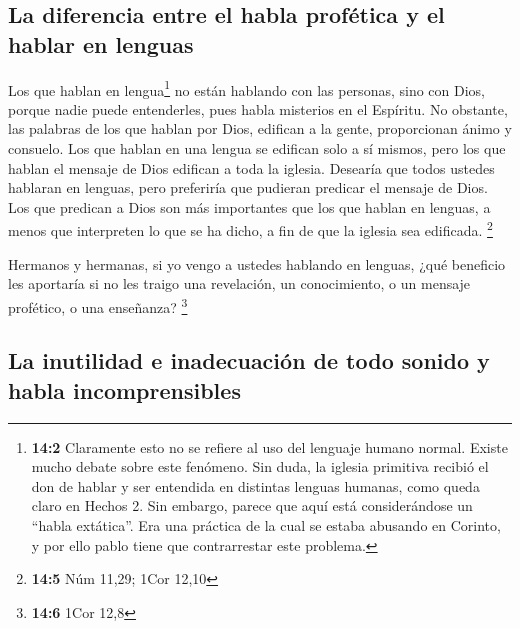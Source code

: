 \hypertarget{la-diferencia-entre-el-habla-profuxe9tica-y-el-hablar-en-lenguas}{%
\subsection{La diferencia entre el habla profética y el hablar en
lenguas}\label{la-diferencia-entre-el-habla-profuxe9tica-y-el-hablar-en-lenguas}}

 Los que hablan en lengua\footnote{\textbf{14:2}
  Claramente esto no se refiere al uso del lenguaje humano normal.
  Existe mucho debate sobre este fenómeno. Sin duda, la iglesia
  primitiva recibió el don de hablar y ser entendida en distintas
  lenguas humanas, como queda claro en Hechos 2. Sin embargo, parece que
  aquí está considerándose un ``habla extática''. Era una práctica de la
  cual se estaba abusando en Corinto, y por ello pablo tiene que
  contrarrestar este problema.} no están hablando con las personas, sino
con Dios, porque nadie puede entenderles, pues habla misterios en el
Espíritu.  No obstante, las palabras de los que hablan por
Dios, edifican a la gente, proporcionan ánimo y consuelo. 
Los que hablan en una lengua se edifican solo a sí mismos, pero los que
hablan el mensaje de Dios edifican a toda la iglesia. Desearía que todos
ustedes hablaran en lenguas, pero preferiría que pudieran predicar el
mensaje de Dios.  Los que predican a Dios son más
importantes que los que hablan en lenguas, a menos que interpreten lo
que se ha dicho, a fin de que la iglesia sea edificada. \footnote{\textbf{14:5}
  Núm 11,29; 1Cor 12,10}

 Hermanos y hermanas, si yo vengo a ustedes hablando en
lenguas, ¿qué beneficio les aportaría si no les traigo una revelación,
un conocimiento, o un mensaje profético, o una enseñanza? \footnote{\textbf{14:6}
  1Cor 12,8}

\hypertarget{la-inutilidad-e-inadecuaciuxf3n-de-todo-sonido-y-habla-incomprensibles}{%
\subsection{La inutilidad e inadecuación de todo sonido y habla
incomprensibles}\label{la-inutilidad-e-inadecuaciuxf3n-de-todo-sonido-y-habla-incomprensibles}}

